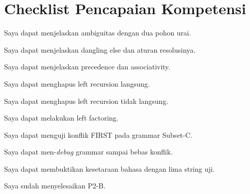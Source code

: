 \section*{Checklist Pencapaian Kompetensi}

\begin{checklist}
  \item Saya dapat menjelaskan ambiguitas dengan dua pohon urai.
  \item Saya dapat menjelaskan dangling else dan aturan resolusinya.
  \item Saya dapat menjelaskan precedence dan associativity.
  \item Saya dapat menghapus left recursion langsung.
  \item Saya dapat menghapus left recursion tidak langsung.
  \item Saya dapat melakukan left factoring.
  \item Saya dapat menguji konflik FIRST pada grammar Subset-C.
  \item Saya dapat men-\textit{debug} grammar sampai bebas konflik.
  \item Saya dapat membuktikan kesetaraan bahasa dengan lima string
        uji.
  \item Saya sudah menyelesaikan P2-B.
\end{checklist}
